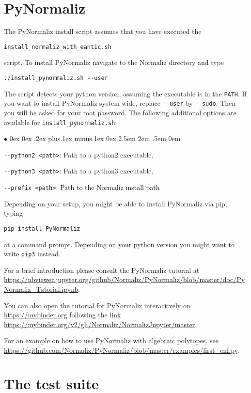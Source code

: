 \documentclass[12pt,a4paper]{scrartcl}
\newcommand{\stdli}{ \topsep0ex \partopsep0ex %
\parsep.2ex plus.1ex minus.1ex \itemsep0ex%
\leftmargin2.5em \labelwidth2em \labelsep.5em \rightmargin0em}%
\renewenvironment{itemize}{\begin{list}{{$\bullet$}}{\stdli}}{\end{list}}
\theoremstyle{definition}
\begin{document}
\section{PyNormaliz}\label{PyNormaliz}
The PyNormaliz install script assumes that you have executed the
\begin{center}
\verb|install_normaliz_with_eantic.sh|
\end{center}
script. To install PyNormaliz navigate to the Normaliz directory and type
\begin{Verbatim}
./install_pynormaliz.sh --user
\end{Verbatim}
The script detects your python version, assuming the executable is in the \verb|PATH|. If you want to install PyNormaliz system wide,
replace \verb|--user| by \verb|--sudo|. Then you will be asked for your root password.
The following additional options are available for \verb|install_pynormaliz.sh|:
\begin{itemize}
	\item \verb|--python2 <path>|: Path to a python2 executable.
	\item \verb|--python3 <path>|: Path to a python3 executable.
	\item \verb|--prefix <path>|: Path to the Normaliz install path
\end{itemize}

Depending on your setup, you might be able to install PyNormaliz via pip, typing
\begin{Verbatim}
pip install PyNormaliz
\end{Verbatim}
at a command prompt. Depending on your python version you might want to write \verb|pip3| instead.


For a brief introduction please consult the PyNormaliz tutorial at \url{https://nbviewer.jupyter.org/github/Normaliz/PyNormaliz/blob/master/doc/PyNormaliz_Tutorial.ipynb}.

You can also open the tutorial for PyNormaliz interactively on \url{https://mybinder.org} following the link \url{https://mybinder.org/v2/gh/Normaliz/NormalizJupyter/master}.

For an example on how to use PyNormaliz with algebraic polytopes, see \url{https://github.com/Normaliz/PyNormaliz/blob/master/examples/first_enf.py}.

\section{The test suite}
\end{document}
